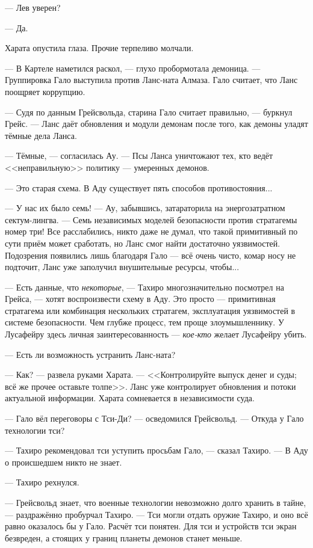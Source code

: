 --- Лев уверен?

--- Да.

Харата опустила глаза.
Прочие терпеливо молчали.

--- В Картеле наметился раскол, --- глухо пробормотала демоница.
--- Группировка Гало выступила против Ланс-ната Алмаза.
Гало считает, что Ланс поощряет коррупцию.

--- Судя по данным Грейсвольда, старина Гало считает правильно, --- буркнул Грейс.
--- Ланс даёт обновления и модули демонам после того, как демоны уладят тёмные дела Ланса.

--- Тёмные, --- согласилась Ау.
--- Псы Ланса уничтожают тех, кто ведёт <<неправильную>> политику --- умеренных демонов.

--- Это старая схема.
В Аду существует пять способов противостояния...

--- У нас их было семь! --- Ау, забывшись, затараторила на энергозатратном сектум-лингва.
--- Семь независимых моделей безопасности против стратагемы номер три!
Все расслабились, никто даже не думал, что такой примитивный по сути приём может сработать, но Ланс смог найти достаточно уязвимостей.
Подозрения появились лишь благодаря Гало --- всё очень чисто, комар носу не подточит, Ланс уже заполучил внушительные ресурсы, чтобы...

--- Есть данные, что \emph{некоторые}, --- Тахиро многозначительно посмотрел на Грейса, --- хотят воспроизвести схему в Аду.
Это просто --- примитивная стратагема или комбинация нескольких стратагем, эксплуатация уязвимостей в системе безопасности.
Чем глубже процесс, тем проще злоумышленнику.
У Лусафейру здесь личная заинтересованность --- \emph{кое-кто} желает Лусафейру убить.

--- Есть ли возможность устранить Ланс-ната?

--- Как? --- развела руками Харата.
--- <<Контролируйте выпуск денег и суды; всё же прочее оставьте толпе>>.
Ланс уже контролирует обновления и потоки актуальной информации.
Харата сомневается в независимости суда.

--- Гало вёл переговоры с Тси-Ди? --- осведомился Грейсвольд.
--- Откуда у Гало технологии тси?

--- Тахиро рекомендовал тси уступить просьбам Гало, --- сказал Тахиро.
--- В Аду о происшедшем никто не знает.

--- Тахиро рехнулся.

--- Грейсвольд знает, что военные технологии невозможно долго хранить в тайне, --- раздражённо пробурчал Тахиро.
--- Тси могли отдать оружие Тахиро, и оно всё равно оказалось бы у Гало.
Расчёт тси понятен.
Для тси и устройств тси экран безвреден, а стоящих у границ планеты демонов станет меньше.


